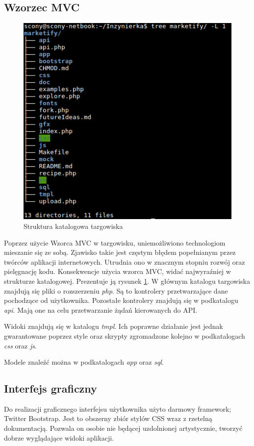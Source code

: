 \documentclass[11pt,a4paper,polish,thesis]{dcsbook}
\begin{document}
\subsection{Wzorzec MVC}
\begin{figure}[H]
  \centering
  \includegraphics[scale=0.7]{./resources/market_tree.png}
  \caption{Struktura katalogowa targowiska}
  \label{fig:market_tree}
\end{figure}
Poprzez użycie Wzorca MVC w targowisku, uniemożliwiono technologiom mieszanie się ze sobą. Zjawisko takie jest częstym błędem popełnianym przez twórców aplikacji
internetowych. Utrudnia ono w znacznym stopniu rozwój oraz pielęgnację kodu. Konsekwencje użycia wzorca MVC, widać najwyraźniej w strukturze katalogowej.
Prezentuje ją rysunek \ref{fig:market_tree}.
W głównym katalogu targowiska znajdują się pliki o rozszerzeniu \emph{php}. Są to kontrolery przetwarzające dane pochodzące od użytkownika. Pozostałe kontrolery
znajdują się w podkatalogu \emph{api}. Mają one na celu przetwarzanie żądań kierowanych do API.

Widoki znajdują się w katalogu \emph{tmpl}. Ich poprawne działanie jest jednak gwarantowane poprzez style oraz skrypty zgromadzone kolejno w podkatalogach
\emph{css} oraz \emph{js}.

Modele znaleźć można w podkatalogach \emph{app} oraz \emph{sql}.

\subsection{Interfejs graficzny}
Do realizacji graficznego interfejsu użytkownika użyto darmowy framework; Twitter Bootstrap. Jest to obszerny zbiór stylów CSS wraz z rzetelną dokumentacją. Pozwala on
osobie nie będącej uzdolnionej artystycznie, tworzyć dobrze wyglądające widoki aplikacji.
\end{document}
